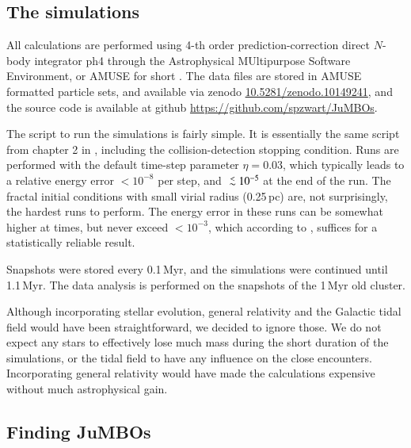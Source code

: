 \documentclass[submission,phys]{lib/SciPost}
\def\aplt{\ {\raise-.5ex\hbox{$\buildrel<\over\sim$}}\ }
\newcommand{\jumbos}{\mbox{JuMBOs}}
\begin{document}
\subsection{The simulations}

All calculations are performed using 4-th order prediction-correction
direct $N$-body integrator {\sc ph4} \cite{2022A&A...659A..86P}
through the Astrophysical MUltipurpose Software Environment, or AMUSE
for short
\cite{2013CoPhC.183..456P,2013AA...557A..84P,2018araa.book.....P}.
The data files are stored in {\sc AMUSE} formatted particle sets, and
available via zenodo \url{10.5281/zenodo.10149241}, and the source
code is available at github \url{https://github.com/spzwart/JuMBOs}.

The script to run the simulations is fairly simple.  It is essentially
the same script from chapter 2 in \cite{2018araa.book.....P},
including the collision-detection stopping condition.  Runs are
performed with the default time-step parameter $\eta=0.03$, which
typically leads to a relative energy error $<10^{-8}$ per step, and
$\aplt 10^{-5}$ at the end of the run. The fractal initial conditions with
small virial radius (0.25\,pc) are, not surprisingly, the hardest runs
to perform. The energy error in these runs can be somewhat higher at
times, but never exceed $<10^{-3}$, which according to
\cite{2041-8205-785-1-L3}, suffices for a statistically reliable
result.

Snapshots were stored every 0.1\,Myr, and the simulations were
continued until 1.1\,Myr. The data analysis is performed on the
snapshots of the 1\,Myr old cluster.

Although incorporating stellar evolution, general relativity and the
Galactic tidal field would have been straightforward, we decided to
ignore those.  We do not expect any stars to effectively lose much
mass during the short duration of the simulations, or the tidal field
to have any influence on the close encounters.  Incorporating general
relativity would have made the calculations expensive without much
astrophysical gain.

\subsection{Finding \jumbos}
\end{document}
